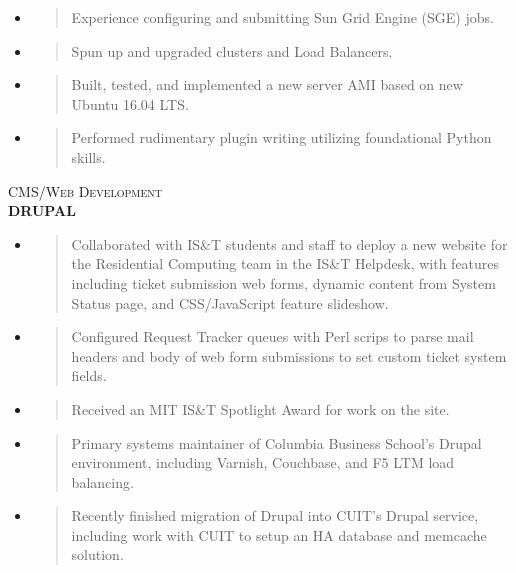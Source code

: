 \documentclass[]{article}
\begin{document}
\begin{itemize}
\item
  \begin{quote}
  Experience configuring and submitting Sun Grid Engine (SGE) jobs.
  \end{quote}
\item
  \begin{quote}
  Spun up and upgraded clusters and Load Balancers.
  \end{quote}
\item
  \begin{quote}
  Built, tested, and implemented a new server AMI based on new Ubuntu
  16.04 LTS.
  \end{quote}
\item
  \begin{quote}
  Performed rudimentary plugin writing utilizing foundational Python
  skills.
  \end{quote}
\end{itemize}

\textsc{CMS/Web Development}\\
\textbf{DRUPAL}

\begin{itemize}
\item
  \begin{quote}
  Collaborated with IS\&T students and staff to deploy a new website for
  the Residential Computing team in the IS\&T Helpdesk, with features
  including ticket submission web forms, dynamic content from System
  Status page, and CSS/JavaScript feature slideshow.
  \end{quote}
\item
  \begin{quote}
  Configured Request Tracker queues with Perl scrips to parse mail
  headers and body of web form submissions to set custom ticket system
  fields.
  \end{quote}
\item
  \begin{quote}
  Received an MIT IS\&T Spotlight Award for work on the site.
  \end{quote}
\item
  \begin{quote}
  Primary systems maintainer of Columbia Business School's Drupal
  environment, including Varnish, Couchbase, and F5 LTM load balancing.
  \end{quote}
\item
  \begin{quote}
  Recently finished migration of Drupal into CUIT's Drupal service,
  including work with CUIT to setup an HA database and memcache
  solution.
  \end{quote}
\end{itemize}
\end{document}
